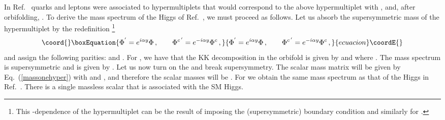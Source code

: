 \documentclass[a4paper,12pt]{article}
\providecommand{\Zparity}{\ensuremath{\mathbb{Z}_2}}
\begin{document}
In Ref.~\cite{bhn} 
quarks and leptons were associated to  hypermultiplets
that would correspond to the above hypermultiplet
with \coordHE{}, \coordHE{} and, after orbifolding,
\coordHE{}.
To derive the mass spectrum of the Higgs of Ref.~\cite{bhn},
 we must proceed 
as follows.
Let us 
absorb the supersymmetric mass \coordHE{}  of the hypermultiplet
by the redefinition
\footnote{This \coordHE{}-dependence of the hypermultiplet 
can be the result of imposing the 
(supersymmetric) boundary condition 
\coordHE{}
and similarly for
\coordHE{}.} 
\begin{equation}\coord{}\boxEquation{
\Phi^{'} = e^{i \alpha y}\Phi
\, ,\qquad 
\Phi^{c\, '} 
= e^{-i \alpha y}\Phi^c\, ,
}{
\Phi^{'} = e^{i \alpha y}\Phi
\, ,\qquad 
\Phi^{c\, '} 
= e^{-i \alpha y}\Phi^c\, ,
}{ecuacion}\coordE{}\end{equation}
and assign  the following \myHighlight{$\Zparity$}\coordHE{}
parities:
\coordHE{}
and \coordHE{}.
For \coordHE{}, we have
 that the KK decomposition 
in  the \myHighlight{$S^1/\Zparity$}\coordHE{} orbifold 
is given by
\coordHE{}
and \coordHE{} 
where \coordHE{}.
The mass spectrum  is supersymmetric and is given by \coordHE{}. 
Let us now turn on the \coordHE{} and break supersymmetry. 
The scalar mass matrix will be given by 
Eq.~(\ref{massonehyper}) with \coordHE{} and \coordHE{},
and therefore the scalar
masses will be \coordHE{}. 
For \coordHE{} we obtain the same mass spectrum as that of the
Higgs in Ref.~\cite{bhn}.
There is a single massless scalar that is associated 
with the SM Higgs.
\end{document}
